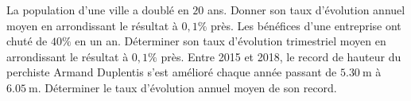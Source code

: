 \documentclass{exam}
\begin{document}
\begin{questions}
\makeemptybox{5cm}
\newpage
\question La population d'une ville a doublé en $20$ ans. Donner son taux d'évolution annuel moyen en arrondissant le résultat à $0,1\%$ près.
\makeemptybox{3cm}
\question Les bénéfices d'une entreprise ont chuté de $40\%$ en un an. Déterminer son taux d'évolution trimestriel moyen en arrondissant le résultat à $0,1\%$ près.
\makeemptybox{3cm}
\question Entre 2015 et 2018, le record de hauteur du perchiste Armand Duplentis s'est amélioré chaque année passant de $\qty{5,30}{\meter}$ à $\qty{6,05}{\meter}$. Déterminer le taux d'évolution annuel moyen de son record.
\makeemptybox{3cm}
\end{questions}
\end{document}
